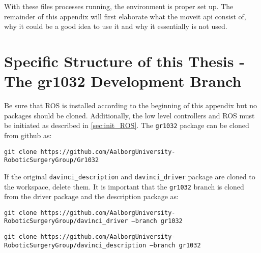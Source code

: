With these files processes running, the environment is proper set up. The remainder of this appendix will first elaborate what the moveit \gls{api} consist of, why it could be a good idea to use it and why it essentially is not used.
\section{Specific Structure of this Thesis - The gr1032 Development Branch}\label{appsec:ros_development}
Be sure that ROS is installed according to the beginning of this appendix but no packages should be cloned. Additionally, the low level controllers and ROS must be initiated as described in \autoref{sec:init_ROS}. The \texttt{gr1032} package can be cloned from github as:
\vspace{0.2cm}


\hspace{0.0cm}  \texttt{git clone https://github.com/AalborgUniversity-RoboticSurgeryGroup/Gr1032}
\vspace{0.2cm}


If the original \texttt{davinci\_description} and \texttt{davinci\_driver} package are cloned to the workspace, delete them. It is important that the \texttt{gr1032} branch is cloned from the driver package and the description package as:
\vspace{0.2cm}

\hspace{0.0cm}  \texttt{git clone https://github.com/AalborgUniversity-RoboticSurgeryGroup/davinci\_driver ---branch gr1032}
\vspace{0.2cm}


\hspace{0.0cm}  \texttt{git clone https://github.com/AalborgUniversity-RoboticSurgeryGroup/davinci\_description ---branch gr1032}
\vspace{0.2cm}


